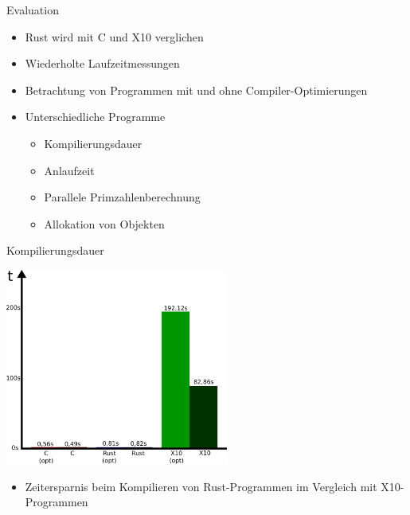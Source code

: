 \begin{frame}{Evaluation}
    \begin{itemize}
      \item Rust wird mit C und X10 verglichen
      \item Wiederholte Laufzeitmessungen
      \item Betrachtung von Programmen mit und ohne Compiler-Optimierungen
      \item Unterschiedliche Programme
        \begin{itemize}
          \item Kompilierungsdauer
          \item Anlaufzeit
          \item Parallele Primzahlenberechnung
          \item Allokation von Objekten
        \end{itemize}
    \end{itemize}
\end{frame}

\begin{frame}{Kompilierungsdauer}
  \begin{center}
    \includegraphics[width=0.55\textwidth]{images/compile-eval.pdf}
  \end{center}
  \begin{itemize}
    \item Zeitersparnis beim Kompilieren von Rust-Programmen im Vergleich mit X10-Programmen
  \end{itemize}
\end{frame}

